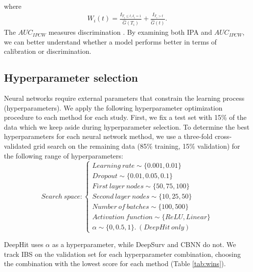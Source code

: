 \documentclass[preprint,12pt,authoryear]{elsarticle}
\begin{document}
where \begin{align*}
W_{i}(t)=\frac{I_{T_{i}\leq t,\delta_{i}=1}}{\widehat{G}(T_{i})} +\frac{I_{T_{i}>t}}{\widehat{G}(t)}.
\end{align*} The $AUC_{IPCW}$ measures discrimination \citep{auc}. By examining both IPA and $AUC_{IPCW}$,
we can better understand whether a model performs better in terms of calibration or discrimination.

\hypertarget{hyperparameter-selection}{%
\subsection{Hyperparameter selection}\label{hyperparameter-selection}}

Neural networks require external parameters that constrain the learning process (hyperparameters). We apply the following hyperparameter
optimization procedure to each method for each study. First, we fix a test set with 15\% of the data which we keep aside during hyperparameter selection.
To determine the best hyperparameters for each neural network method, we use a three-fold cross-validated grid search \citep{gulli2017} on the remaining
data (85\% training, 15\% validation) for the following range of hyperparameters:
\[
Search \ space: \begin{cases}
Learning\ rate \sim \{0.001, 0.01\} \\ 
Dropout \sim \{0.01,0.05, 0.1\} \\
First\ layer\ nodes \sim \{50, 75, 100\} \\
Second\ layer\ nodes \sim \{10,25,50\} \\
Number\ of\ batches \sim \{100, 500\} \\
Activation\ function \sim \{ReLU, Linear\}\\
\alpha \sim \{0, 0.5, 1\}. \ (DeepHit \ only)
\end{cases}
\] 


DeepHit uses $\alpha$ as a hyperparameter, while DeepSurv and CBNN do not. We track IBS on the validation set for each hyperparameter combination,
choosing the combination with the lowest score for each method (Table \ref{tab:wins}).
\end{document}
